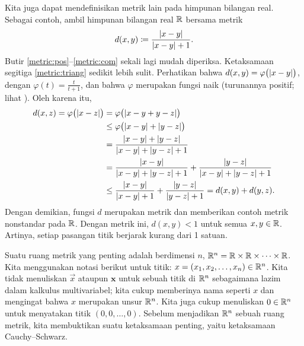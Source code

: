 \begin{example}
Kita juga dapat mendefinisikan metrik lain pada himpunan bilangan real.
Sebagai contoh, ambil himpunan bilangan real ${\mathbb{R}}$ bersama metrik
\begin{equation*}
d(x,y) \coloneqq
\frac{\lvert {x-y} \rvert}{\lvert {x-y} \rvert+1} .
\end{equation*}
Butir \ref{metric:pos}--\ref{metric:com} sekali lagi mudah diperiksa.
Ketaksamaan segitiga \ref{metric:triang} sedikit lebih sulit.
Perhatikan bahwa $d(x,y) = \varphi\bigl(\lvert {x-y} \rvert\bigr)$, dengan
$\varphi(t) =
\frac{t}{t+1}$, dan bahwa $\varphi$ merupakan fungsi naik
(turunannya positif; lihat ).
Oleh karena itu,
\begin{equation*}
\begin{split}
d(x,z) = \varphi\bigl(\lvert {x-z} \rvert\bigr)
& = 
\varphi\bigl(\lvert {x-y+y-z} \rvert\bigr) \\
& \leq
\varphi\bigl(\lvert {x-y} \rvert+\lvert {y-z} \rvert\bigr)
\\
& =
\frac{\lvert {x-y} \rvert+\lvert {y-z} \rvert}{\lvert {x-y} \rvert+\lvert {y-z} \rvert+1} \\
& =
\frac{\lvert {x-y} \rvert}{\lvert {x-y} \rvert+\lvert {y-z} \rvert+1} +
\frac{\lvert {y-z} \rvert}{\lvert {x-y} \rvert+\lvert {y-z} \rvert+1}
\\
& \leq
\frac{\lvert {x-y} \rvert}{\lvert {x-y} \rvert+1} +
\frac{\lvert {y-z} \rvert}{\lvert {y-z} \rvert+1} =
d(x,y)+ d(y,z) .
\end{split}
\end{equation*}
Dengan demikian, fungsi $d$ merupakan metrik dan memberikan
contoh metrik nonstandar pada ${\mathbb{R}}$.  Dengan metrik ini,
$d(x,y) < 1$ untuk semua $x,y \in {\mathbb{R}}$.  Artinya,
setiap pasangan titik berjarak kurang dari 1 satuan.
\begin{myfigureht}
\caption{Grafik $\frac{t}{t+1}$ untuk $t$ positif dengan asimtot pada 1.\label{fig:tovertp1}}
\end{myfigureht}
\end{example}

Suatu ruang metrik yang penting adalah
\emph{} berdimensi $n$,
${\mathbb{R}}^n = {\mathbb{R}} \times {\mathbb{R}} \times \cdots \times {\mathbb{R}}$.   Kita menggunakan notasi berikut
untuk titik: $x =(x_1,x_2,\ldots,x_n) \in {\mathbb{R}}^n$.  Kita tidak menuliskan
$\vec{x}$ ataupun $\mathbf{x}$ untuk sebuah titik di ${\mathbb{R}}^n$ sebagaimana lazim dalam
kalkulus multivariabel;
kita cukup memberinya nama seperti $x$ dan mengingat bahwa $x$
merupakan unsur ${\mathbb{R}}^n$.
Kita juga
cukup menuliskan $0 \in {\mathbb{R}}^n$ untuk menyatakan titik $(0,0,\ldots,0)$.  Sebelum
menjadikan ${\mathbb{R}}^n$ sebuah ruang metrik, kita membuktikan suatu ketaksamaan penting, yaitu
ketaksamaan Cauchy--Schwarz.

